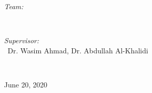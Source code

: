 \begin{titlepage}
\begin{minipage}{0.4\textwidth}
\begin{flushleft} \large
\emph{Team:}\\
\@author %
\end{flushleft}
\end{minipage}
~
\begin{minipage}{0.4\textwidth}
\begin{flushright} \large
\emph{Supervisor:} \\
\ Dr. Wasim Ahmad, \linebreak Dr. Abdullah Al-Khalidi \\[1.2em] %
\end{flushright}
\end{minipage}\\[2cm]
\makeatother



{\large June 20, 2020}\\[2cm] %

\vfill %

\end{titlepage}